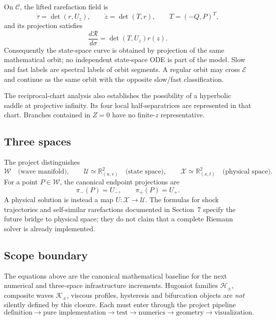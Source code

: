 On $\mathcal C$, the lifted rarefaction field is
\[
 \dot\tau=\det(r,U_z),\qquad
 \dot z=\det(T,r),\qquad T=(-Q,P)^T,
\]
and its projection satisfies
\[
 \frac{d\mathcal R}{d\sigma}=\det(T,U_z)r(z).
\]
Consequently the state-space curve is obtained by projection of the same mathematical
orbit; no independent state-space ODE is part of the model.  Slow and fast labels are
spectral labels of orbit segments.  A regular orbit may cross $\mathcal E$ and continue
as the same orbit with the opposite slow/fast classification.

The reciprocal-chart analysis also establishes the possibility of a hyperbolic saddle
at projective infinity.  Its four local half-separatrices are represented in that chart.
Branches contained in $Z=0$ have no finite-$z$ representative.

\subsection{Three spaces}

The project distinguishes
\[
 \mathcal W\quad\text{(wave manifold)},\qquad
 \mathcal U\simeq\mathbb R^2_{(u,v)}\quad\text{(state space)},\qquad
 \mathcal X\simeq\mathbb R^2_{(x,t)}\quad\text{(physical space)}.
\]
For a point $P\in\mathcal W$, the canonical endpoint projections are
\[
 \pi_-(P)=U_-,\qquad \pi_+(P)=U_+.
\]
A physical solution is instead a map $U:\mathcal X\to\mathcal U$.  The formulas for
shock trajectories and self-similar rarefactions documented in Section~7 specify the
future bridge to physical space; they do not claim that a complete Riemann solver is
already implemented.

\subsection{Scope boundary}

The equations above are the canonical mathematical baseline for the next numerical and
three-space infrastructure increments.  Hugoniot families $\mathcal H_\pm$, composite
waves $\mathcal K_\pm$, viscous profiles, hysteresis and bifurcation objects are
\emph{not} silently defined by this closure.  Each must enter through the project
pipeline
\[
 \boxed{\text{definition}\to\text{pure implementation}\to\text{test}
 \to\text{numerics}\to\text{geometry}\to\text{visualization}.}
\]
